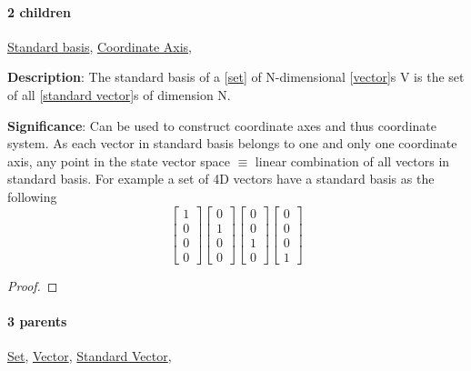 \documentclass[../main.tex]{subfiles}
\begin{document}
\paragraph{2 children} \hyperref[statement:Standard basis]{Standard basis}, \hyperref[statement:Coordinate Axis]{Coordinate Axis}, 



\begin{statement}
\label{statement:Standard basis}\hspace*{0pt}\par
\end{statement}
\textbf{Description}:
The standard basis of a [\hyperref[statement:Set]{set}] of N-dimensional [\hyperref[statement:Vector]{vector}]s V is the set of all [\hyperref[statement:Standard Vector]{standard vector}]s of dimension N.
\par
{\color{magenta} \textbf{Significance}:
Can be used to construct coordinate axes and thus coordinate system.
As each vector in standard basis belongs to one and only one coordinate axis, any point in the state vector space $ \equiv $ linear combination of all vectors in standard basis.
For example a set of 4D vectors have a standard basis as the following
\[
  \begin{bmatrix} 1 \\ 0 \\ 0 \\ 0 \end{bmatrix}
  \begin{bmatrix} 0 \\ 1 \\ 0 \\ 0 \end{bmatrix}
  \begin{bmatrix} 0 \\ 0 \\ 1 \\ 0 \end{bmatrix}
  \begin{bmatrix} 0 \\ 0 \\ 0 \\ 1 \end{bmatrix}
\]
\par}
\begin{proof}
\proofbydefinition
\end{proof}\par
\paragraph{3 parents} \hyperref[statement:Set]{Set}, \hyperref[statement:Vector]{Vector}, \hyperref[statement:Standard Vector]{Standard Vector}, 
\end{document}
